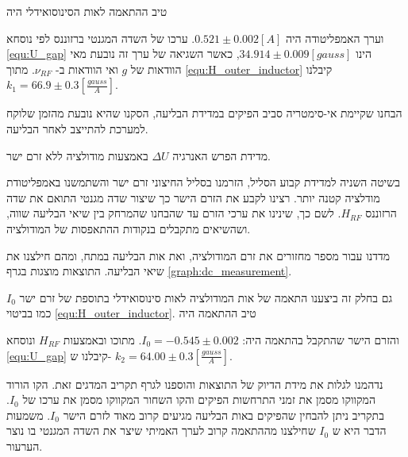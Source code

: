 \documentclass{article}
\begin{document}
טיב ההתאמה לאות הסינוסואידלי היה

וערך האמפליטודה היה
$0.521\pm0.002 [A]$.
ערכו של השדה המגנטי ברזוננס לפי נוסחא
\ref{equ:U_gap}
הינו
$34.914\pm0.009 [gauss]$,
כאשר השגיאה של ערך זה נובעת מאי הוודאות של
$g$
ואי הוודאות ב-
$\nu_{RF}$.
מתוך
\ref{equ:H_outer_inductor}
קיבלנו
$k_1 = 66.9\pm 0.3 [\frac{gauss}{A}]$.

הבחנו שקיימת אי-סימטריה סביב הפיקים במדידת הבליעה, הסקנו שהיא נובעת מהזמן שלוקח למערכת להתייצב לאחר הבליעה.
\begin{graph}[H]
	\begin{center}
	\resizebox{\textwidth}{!}{}
	\end{center}
	\caption{
	מדידת הפרש האנרגיה
	$\Delta U$
	באמצעות מודולציה ללא זרם ישר.
	}
\label{graph:p2p_measurement}
\end{graph}
\clearpage


בשיטה השניה למדידת קבוע הסליל,  הזרמנו בסליל החיצוני זרם ישר והשתמשנו באמפליטודת מודלציה קטנה יותר.
רצינו לקבע את הזרם הישר כך שיצור שדה מגנטי התואם את שדה הרזוננס
$H_{RF}$.
לשם כך, שינינו את ערכי הזרם עד שהבחנו שהמרחק בין שיאי הבליעה שווה, ושהשיאים מתקבלים בנקודות ההתאפסות של המודולציה.

מדדנו עבור מספר מחזורים את זרם המודולציה,
ואת אות הבליעה במתח, ומהם חילצנו את שיאי הבליעה. התוצאות מוצגות בגרף
\ref{graph:dc_measurement}.

\begin{graph}[H]
	\begin{center}
	\resizebox{\textwidth}{!}{}
	\end{center}
	\caption{
	המתח על הסליל החיצוני כתלות בזמן, בזמן בליעה, עבור זרם ישר המוזרם בסליל החיצוני
	}
\label{graph:dc_measurement}
\end{graph}

גם בחלק זה ביצענו התאמה של אות המודולציה לאות סינוסואידלי בתוספת של זרם ישר
$I_0$
כמו בביטוי
\ref{equ:H_outer_inductor}.
טיב ההתאמה היה 

והזרם הישר שהתקבל בהתאמה היה:
$I_0 = -0.545 \pm 0.002$.
מתוכו ובאמצעות
$H_{RF}$
ונוסחא
\ref{equ:U_gap}
קיבלנו ש-
$k_2 = 64.00 \pm 0.3 [\frac{gauss}{A}]$.

נדהמנו לגלות את מידת הדיוק של התוצאות והוספנו לגרף תקריב המדגים זאת. הקו הורוד המקווקו מסמן את זמני התרחשות הפיקים והקו השחור המקווקו מסמן את ערכו של
$I_0$. בתקריב ניתן להבחין שהפיקים באות הבליעה מגיעים קרוב מאוד לזרם הישר
$I_0$.
משמעות הדבר היא ש
$I_0$
שחילצנו מההתאמה 
קרוב לערך האמיתי שיצר את השדה המגנטי בו נוצר הערעור.
\clearpage  
\end{document}
